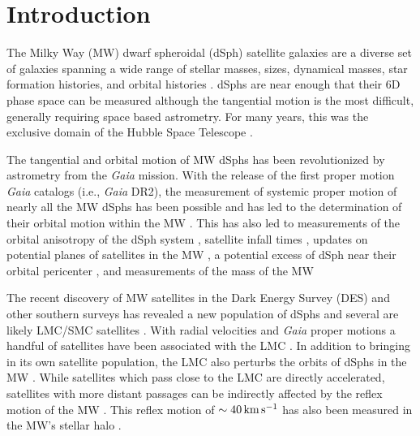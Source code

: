 \documentclass[twocolumn]{aastex63}
\begin{document}
\section{Introduction} \label{sec:intro}


The Milky Way (MW) dwarf spheroidal (dSph) satellite galaxies are a diverse set of galaxies spanning a wide range of stellar masses, sizes,  dynamical masses, star formation histories, and orbital histories \citep[e.g.][]{McConnachie2012AJ....144....4M, Simon2019ARA&A..57..375S}.
dSphs are near enough that their 6D phase space can be measured although the tangential motion is the most difficult, generally requiring space based astrometry. {For many years, this was the exclusive domain of the Hubble Space Telescope} \citep[e.g.,][]{Piatek2007AJ....133..818P, Sohn2017ApJ...849...93S}.


The tangential and orbital motion of MW dSphs  has been revolutionized by astrometry from the {\it Gaia} mission. 
With the release of the first proper motion {\it Gaia}  catalogs (i.e., {\it Gaia} DR2), the measurement of systemic proper motion of nearly all the MW dSphs has been possible \citep[e.g., ][]{GaiaHelmi2018A&A...616A..12G, Simon2018ApJ...863...89S, Fritz2018A&A...619A.103F, Pace2019ApJ...875...77P, McConnachie2020AJ....160..124M} and has led to the determination of their orbital motion within the MW  \citep[e.g., ][]{GaiaHelmi2018A&A...616A..12G, Simon2018ApJ...863...89S, Fritz2018A&A...619A.103F}.
This has also led to measurements of the orbital anisotropy of the dSph system \citep{Riley2019MNRAS.486.2679R}, satellite infall times \citep{Fillingham2019arXiv190604180F}, updates on potential planes of satellites in the MW \citep[also known as, the vast polar structure, ][]{Fritz2018A&A...619A.103F}, a potential excess of dSph near their orbital pericenter \citep{Simon2018ApJ...863...89S, Fritz2018A&A...619A.103F}, and  measurements of the mass of the MW  \citep{Callingham2019MNRAS.484.5453C, Li2020ApJ...894...10L, Fritz2020MNRAS.494.5178F}

The recent discovery of MW satellites in the Dark Energy Survey (DES) and other southern surveys has revealed a new population of dSphs and several are likely LMC/SMC satellites \citep[e.g.,][]{Koposov2015ApJ...805..130K, Bechtol2015ApJ...807...50B, Torrealba2018MNRAS.475.5085T}. 
With radial velocities and {\it Gaia} proper motions a handful of satellites have been associated with the LMC \citep{Kallivayalil2018ApJ...867...19K,Erkal2020MNRAS.495.2554E, Patel2020ApJ...893..121P}.
In addition to bringing in its own satellite population, the LMC also perturbs the orbits of dSphs in the MW \citep[e.g.][]{Gomez2015ApJ...802..128G,Erkal2020MNRAS.495.2554E, Patel2020ApJ...893..121P}. While satellites which pass close to the LMC are directly accelerated, satellites with more distant passages can be indirectly affected by the reflex motion of the MW \citep[e.g. Leo I and Antlia 2,][]{Erkal2020MNRAS.498.5574E, Ji2021ApJ...921...32J,CorreaMagnus2022MNRAS.511.2610C}. This reflex motion of $\sim40\mathrm{\,km} \mathrm{\,s}^{-1}$ has also been measured in the MW's stellar halo \citep[][]{Erkal2021MNRAS.506.2677E,Petersen2021NatAs...5..251P}.
\end{document}
